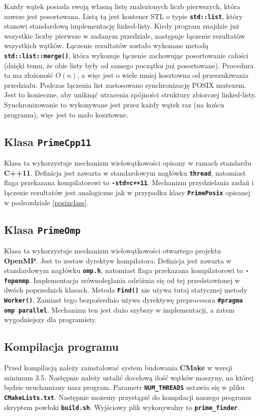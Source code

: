 \documentclass[12pt, twoside, hidelinks, a4paper]{article}
\begin{document}
Każdy wątek posiada swoją własną listę znalezionych liczb pierwszych, która zawsze jest posortowana. Listą tą jest kontener STL o typie \textbf{\texttt{std::list}}, który stanowi  standardową implementację linked-listy. Kiedy program znajdzie już wszystkie liczby pierwsze w zadanym przedziale, następuje łączenie rezultatów wszystkich wątków. Łączenie rezultatów zostało wykonane metodą \textbf{\texttt{std::list::merge()}}, która wykonuje łączenie zachowując posortowanie całości (dzięki temu, że obie listy były od samego początku już posortowane). Procedura ta ma złożoność $O(n)$, a więc jest o wiele mniej kosztowna od przeszukiwania przedziału. Podczas łączenia list zastosowano synchronizację POSIX mutexem. Jest to konieczne, aby uniknąć utracenia spójności struktury zbiorczej linked-listy. Synchronizowanie to wykonywane jest przez każdy wątek raz (na końcu programu), więc jest to mało kosztowne.

\subsection{Klasa \textbf{\texttt{PrimeCpp11}}}
Klasa ta wykorzystuje mechanizm wielowątkowości opisany w ramach standardu \textbf{C++11}. Definicja jest zawarta w standardowym nagłówku \textbf{\texttt{thread}}, natomiast flaga przekazana kompilatorowi to \textbf{\texttt{-std=c++11}}. Mechanizm przydzielania zadań i łączenie rezultatów jest analogiczne jak w przypadku klasy \textbf{\texttt{PrimePosix}} opisanej w podrozdziale \ref{posixclass}.

\subsection{Klasa \textbf{\texttt{PrimeOmp}}}
Klasa ta wykorzystuje mechanizm wielowątkowości otwartego projektu \textbf{OpenMP}. Jest to zestaw dyrektyw kompilatora. Definicja jest zawarta w standardowym nagłówku \textbf{\texttt{omp.h}}, natomiast flaga przekazana kompilatorowi to \textbf{\texttt{-fopenmp}}. Implementacja zrównoleglania odróżnia się od tej przedstawionej w dwóch poprzednich klasach. Metoda \textbf{\texttt{Find()}} nie używa tutaj statycznej metody \textbf{\texttt{Worker()}}. Zamiast tego bezpośrednio używa dyrektywę preprocesora \textbf{\texttt{\#pragma omp parallel}}. Mechanizm ten jest dużo szybszy w implementacji, a zatem wygodniejszy dla programisty.

\subsection{Kompilacja programu}
Przed kompilacją należy zainstalować system budowania \textbf{CMake} w wersji minimum 3.5. Następnie należy ustalić docelową ilość wątków maszyny, na której będzie uruchamiany nasz program. Parametr \textbf{\texttt{NUM\_THREADS}} ustawia się w pliku \textbf{\texttt{CMakeLists.txt}}. Następnie możemy przystąpić do kompilacji naszego programu skryptem powłoki \textbf{\texttt{build.sh}}. Wyjściowy plik wykonywalny to \textbf{\texttt{prime\_finder}}.
\end{document}

